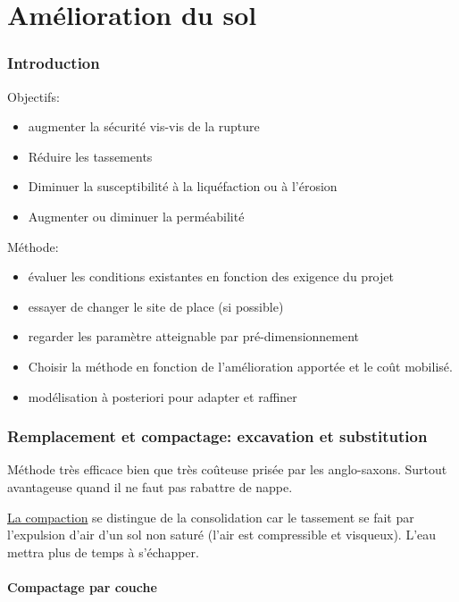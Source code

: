 \part{Amélioration du sol}

\section{Introduction}

Objectifs:
\begin{itemize}
    \item augmenter la sécurité vis-vis de la rupture
    \item Réduire les tassements
    \item Diminuer la susceptibilité à la liquéfaction ou à l'érosion
    \item Augmenter ou diminuer la perméabilité
\end{itemize}

\medskip

Méthode:
\begin{itemize}
    \item évaluer les conditions existantes en fonction des exigence du projet
    \item essayer de changer le site de place (si possible)
    \item regarder les paramètre atteignable par pré-dimensionnement
    \item Choisir la méthode en fonction de l'amélioration apportée et le coût mobilisé.
    \item modélisation à posteriori pour adapter et raffiner
\end{itemize} 

\medskip

\section{Remplacement et compactage: excavation et substitution}

Méthode très efficace bien que très coûteuse prisée par les anglo-saxons. Surtout avantageuse quand il ne faut pas rabattre de nappe. 

\underline{La compaction} se distingue de la consolidation car le tassement se fait par l'expulsion d'air d'un sol non saturé (l'air est compressible et visqueux). L'eau mettra plus de temps à s'échapper.

\subsection{Compactage par couche}

